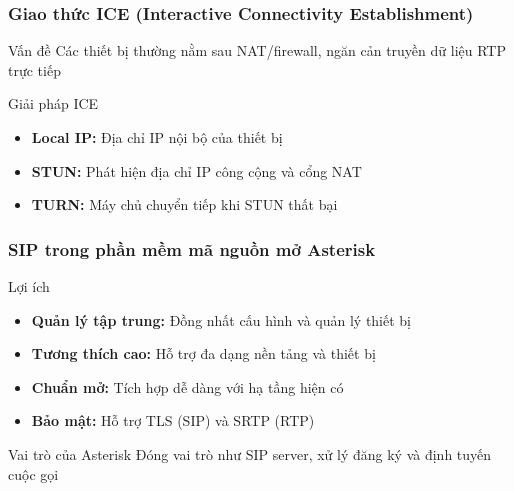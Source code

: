 \begin{frame}
\frametitle{Giao thức ICE (Interactive Connectivity Establishment)}

\begin{block}{Vấn đề}
Các thiết bị thường nằm sau NAT/firewall, ngăn cản truyền dữ liệu RTP trực tiếp
\end{block}

\begin{block}{Giải pháp ICE}
\begin{itemize}
\item \textbf{Local IP:} Địa chỉ IP nội bộ của thiết bị
\item \textbf{STUN:} Phát hiện địa chỉ IP công cộng và cổng NAT
\item \textbf{TURN:} Máy chủ chuyển tiếp khi STUN thất bại
\end{itemize}
\end{block}

\end{frame}

\begin{frame}
\frametitle{SIP trong phần mềm mã nguồn mở Asterisk}

\begin{block}{Lợi ích}
\begin{itemize}
\item \textbf{Quản lý tập trung:} Đồng nhất cấu hình và quản lý thiết bị
\item \textbf{Tương thích cao:} Hỗ trợ đa dạng nền tảng và thiết bị
\item \textbf{Chuẩn mở:} Tích hợp dễ dàng với hạ tầng hiện có
\item \textbf{Bảo mật:} Hỗ trợ TLS (SIP) và SRTP (RTP)
\end{itemize}
\end{block}

\begin{block}{Vai trò của Asterisk}
Đóng vai trò như SIP server, xử lý đăng ký và định tuyến cuộc gọi
\end{block}

\end{frame}

